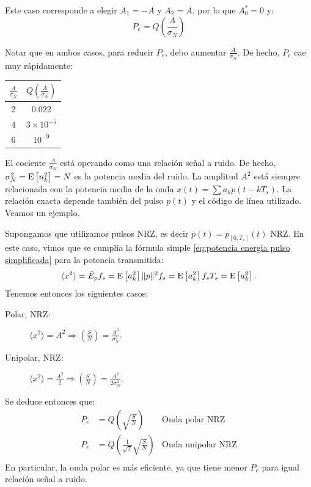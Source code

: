 \begin{ejemplo}
Este caso corresponde a elegir $A_1=-A$ y $A_2=A$, por lo que $A_0^*=0$ y:
\begin{equation*}
    P_e = Q\left(\frac{A}{\sigma_N}\right)
\end{equation*}
\end{ejemplo}

Notar que en ambos casos, para reducir $P_e$, debo aumentar $\frac{A}{\sigma_N}$. De hecho, $P_e$ cae muy rápidamente:
\begin{center}
    \begin{tabular}{c|c}
        $\frac{A}{\sigma_N}$ & $Q\left(\frac{A}{\sigma_N}\right)$\\
        \hline
        $2$ & $0.022$\\
        $4$ & $3\times 10^{-5}$\\
        $6$ & $10^{-9}$
    \end{tabular}
\end{center}

El cociente $\frac{A}{\sigma_N}$ está operando como una relación señal a ruido. De hecho, $\sigma_N^2=\mathrm{E}\left[n_k^2\right]=N$ es la potencia media del ruido. La amplitud $A^2$ está siempre relacionada con la potencia media de la onda $x(t) = \sum a_k p(t-kT_s)$. La relación exacta depende también del pulso $p(t)$ y el código de línea utilizado. Veamos un ejemplo.

\begin{ejemplo}
    Supongamos que utilizamos pulsos NRZ, es decir $p(t)= p_{[0,T_s]}(t)$ NRZ. En este caso, vimos que se cumplía la fórmula simple \eqref{eq:potencia energia pulso simplificada} para la potencia transmitida:
    \begin{equation*}
    \langle x^2 \rangle = \bar{E}_p f_s = \mathrm{E}\left[a_k^2\right]\|p\|^2 f_s = \mathrm{E}\left[a_k^2\right] f_s T_s = \mathrm{E}\left[a_k^2\right].
    \end{equation*} 
    Tenemos entonces los siguientes casos:
    \begin{description}
        \item[Polar, NRZ:] $\langle x^2 \rangle  = A^2 \Rightarrow \left(\frac{S}{N}\right) = \frac{A^2}{\sigma_N^2}$.
        \item[Unipolar, NRZ:] $\langle x^2 \rangle =\frac{A^2}{2}\Rightarrow \left(\frac{S}{N}\right) = \frac{A^2}{2\sigma_N^2}$.
    \end{description}
    Se deduce entonces que:
    \begin{align*}
        P_e &= Q\left(\sqrt{\frac{S}{N}}\right) &\text{Onda polar NRZ}\\
        P_e &= Q\left(\frac{1}{\sqrt{2}}\sqrt{\frac{S}{N}}\right) &\text{Onda unipolar NRZ}\\
    \end{align*}
    En particular, la onda polar es más eficiente, ya que tiene menor $P_e$ para igual relación señal a ruido.
\end{ejemplo}

